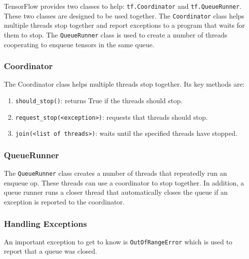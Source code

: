 \documentclass[11pt,a4paper]{article}
\begin{document}
TensorFlow provides two classes to help: \texttt{tf.Coordinator} and \texttt{tf.QueueRunner}. These two classes are designed to be used together. The \texttt{Coordinator} class helps multiple threads stop together and report exceptions to a program that waits for them to stop. The \texttt{QueueRunner} class is used to create a number of threads cooperating to enqueue tensors in the same queue.

\subsubsection{Coordinator}
The Coordinator class helps multiple threads stop together. Its key methods are: 
\begin{enumerate}
\item \texttt{should\_stop()}: returns True if the threads should stop. 
\item \texttt{request\_stop(<exception>)}: requests that threads should stop. 
\item \texttt{join(<list of threads>)}: waits until the specified threads have stopped. 
\end{enumerate}
\subsubsection{QueueRunner}
The \texttt{QueueRunner} class creates a number of threads that repeatedly run an enqueue op. These threads can use a coordinator to stop together. In addition, a queue runner runs a closer thread that automatically closes the queue if an exception is reported to the coordinator.

\subsubsection{Handling Exceptions}
An important exception to get to know is \texttt{OutOfRangeError} which is used to report that a queue was closed. 
\end{document}
